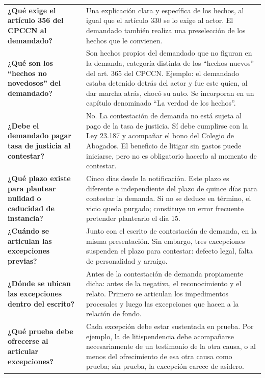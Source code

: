 \documentclass[12pt,oneside]{book}
\begin{document}
\begin{longtable}{
    >{\raggedright\arraybackslash}p{}
    >{\raggedright\arraybackslash}p{}
}
\textbf{¿Qué exige el artículo 356 del CPCCN al demandado?} &
Una explicación clara y específica de los hechos, al igual que el artículo 330 se lo exige al actor. El demandado también realiza una preselección de los hechos que le convienen. \\

\textbf{¿Qué son los ``hechos no novedosos'' del demandado?} &
Son hechos propios del demandado que no figuran en la demanda, categoría distinta de los ``hechos nuevos'' del art. 365 del CPCCN. Ejemplo: el demandado estaba detenido detrás del actor y fue este quien, al dar marcha atrás, chocó su auto. Se incorporan en un capítulo denominado ``La verdad de los hechos''. \\

\textbf{¿Debe el demandado pagar tasa de justicia al contestar?} &
No. La contestación de demanda no está sujeta al pago de la tasa de justicia. Sí debe cumplirse con la Ley 23.187 y acompañar el bono del Colegio de Abogados. El beneficio de litigar sin gastos puede iniciarse, pero no es obligatorio hacerlo al momento de contestar. \\

\textbf{¿Qué plazo existe para plantear nulidad o caducidad de instancia?} &
Cinco días desde la notificación. Este plazo es diferente e independiente del plazo de quince días para contestar la demanda. Si no se deduce en término, el vicio queda purgado; constituye un error frecuente pretender plantearlo el día 15. \\

\textbf{¿Cuándo se articulan las excepciones previas?} &
Junto con el escrito de contestación de demanda, en la misma presentación. Sin embargo, tres excepciones suspenden el plazo para contestar: defecto legal, falta de personalidad y arraigo. \\

\textbf{¿Dónde se ubican las excepciones dentro del escrito?} &
Antes de la contestación de demanda propiamente dicha: antes de la negativa, el reconocimiento y el relato. Primero se articulan los impedimentos procesales y luego las excepciones que hacen a la relación de fondo. \\

\textbf{¿Qué prueba debe ofrecerse al articular excepciones?} &
Cada excepción debe estar sustentada en prueba. Por ejemplo, la de litispendencia debe acompañarse necesariamente de un testimonio de la otra causa, o al menos del ofrecimiento de esa otra causa como prueba; sin prueba, la excepción carece de asidero. \\


\end{longtable}
\end{document}
